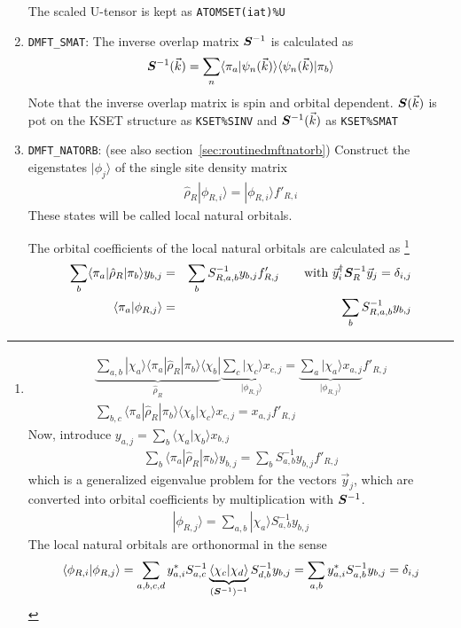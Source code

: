 \documentclass[11pt,a4paper]{report}
\begin{document}
\begin{enumerate}
The scaled U-tensor is kept as \verb|ATOMSET(iat)%U|
%
\item \verb|DMFT_SMAT|: The inverse overlap matrix $\bm{S}^{-1}$ is
  calculated as
\begin{eqnarray}
\bm{S}^{-1}(\vec{k})
=\sum_n\langle\pi_a|\psi_n(\vec{k})\rangle\langle\psi_n(\vec{k})|\pi_b\rangle
\end{eqnarray}
Note that the inverse overlap matrix is spin and orbital dependent.
$\bm{S}(\vec{k})$ is pot on the KSET structure as \verb|KSET%SINV| 
and $\bm{S}^{-1}(\vec{k})$ as \verb|KSET%SMAT| 
%
\item \verb|DMFT_NATORB|: (see also section~\ref{sec:routinedmftnatorb})
  Construct the eigenstates $|\phi_j\rangle$ of the single site
  density matrix
\begin{eqnarray}
\hat{\rho}_R|\phi_{R,i}\rangle=|\phi_{R,i}\rangle f'_{R,i}
\end{eqnarray}
These states will be called local natural orbitals.

The orbital coefficients of the local natural orbitals are calculated as
\footnote{
\begin{eqnarray}
\underbrace{\sum_{a,b}|\chi_a\rangle\langle\pi_a|\hat{\rho}_R|\pi_b\rangle
\langle\chi_b|}_{\hat{\rho}_R}
\underbrace{\sum_c|\chi_c\rangle x_{c,j}}_{|\phi_{R,j}\rangle}
=\underbrace{\sum_a|\chi_a\rangle x_{a,j}}_{|\phi_{R,j}\rangle} f'_{R,j}
\nonumber\\
\sum_{b,c}\langle\pi_a|\hat{\rho}_R|\pi_b\rangle
\langle\chi_b|\chi_c\rangle x_{c,j}
=x_{a,j}f'_{R,j}
\end{eqnarray}
Now, introduce $y_{a,j}=\sum_b\langle\chi_a|\chi_b\rangle x_{b,j}$
\begin{eqnarray}
\sum_{b}\langle\pi_a|\hat{\rho}_R|\pi_b\rangle y_{b,j}
=\sum_b S^{-1}_{a,b}y_{b,j}f'_{R,j}
\end{eqnarray}
which is a generalized eigenvalue problem for the vectors $\vec{y}_j$,
which are converted into orbital coefficients by multiplication with
$\bm{S}^{-1}$.
\begin{eqnarray}
|\phi_{R,j}\rangle=\sum_{a,b}|\chi_a\rangle S^{-1}_{a,b} y_{b,j}
\end{eqnarray}
The local natural orbitals are orthonormal in the sense
\begin{eqnarray}
\langle\phi_{R,i}|\phi_{R,j}\rangle
=\sum_{a,b,c,d}
y^*_{a,i}S^{-1}_{a,c}
\underbrace{\langle\chi_c|\chi_d\rangle}_{(\bm{S}^{-1})^{-1}}
 S^{-1}_{d,b} y_{b,j}
=\sum_{a,b}y^*_{a,i}S^{-1}_{a,b}y_{b,j}=\delta_{i,j}
\end{eqnarray}
}
\begin{eqnarray}
\sum_{b}\langle\pi_a|\hat{\rho}_R|\pi_b\rangle y_{b,j}
&=&\sum_b S^{-1}_{R,a,b}y_{b,j}f'_{R,j}
\qquad\text{with $\vec{y}^\dagger_i \bm{S}^{-1}_R\vec{y}_{j}=\delta_{i,j}$}
\\
\langle\pi_a|\phi_{R,j}\rangle&=&\sum_{b} S^{-1}_{R,a,b} y_{b,j}
\end{eqnarray}


\end{enumerate}
\end{document}
